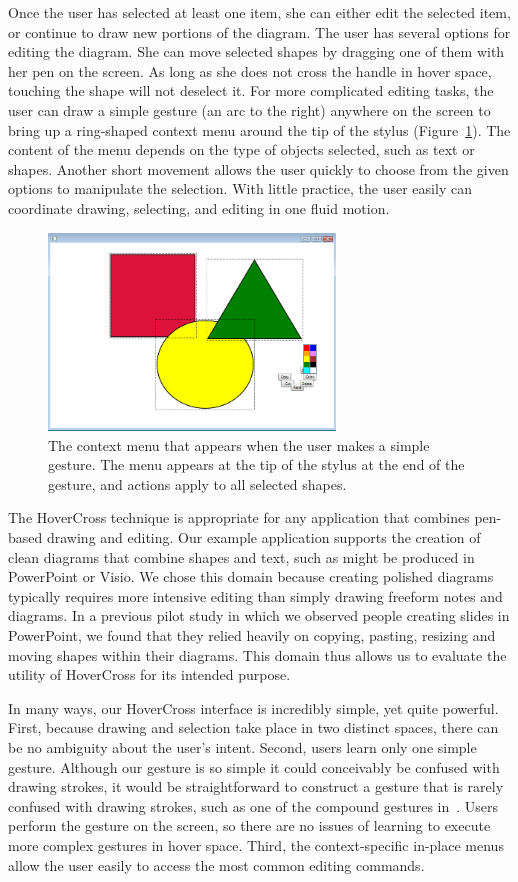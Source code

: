 \documentclass{article}
\begin{document}
Once the user has selected at least one item, she can either edit the
selected item, or continue to draw new portions of the diagram.  The
user has several options for editing the diagram.  She can move
selected shapes by dragging one of them with her pen on the
screen. As long as she does not cross the handle in hover space,
touching the shape will not deselect it.  For more complicated
editing tasks, the user can draw a simple gesture (an arc to the
right) anywhere on the screen to bring up a ring-shaped context menu
around the tip of the stylus (Figure~\ref{fig:contextMenu}).  The
content of the menu depends on the type of objects selected, such
as text or shapes. Another short movement allows the user quickly to
choose from the given options to manipulate the selection. With little
practice, the user easily can coordinate drawing, selecting, and
editing in one fluid motion.

\begin{figure}[tb]
\includegraphics[width=3.0in]{ColorMenu}
\caption{The context menu that appears when the user makes a simple
  gesture.  The menu appears at the tip of the stylus at the end of
  the gesture, and actions apply to all selected shapes.}
\label{fig:contextMenu}
\end{figure}

The HoverCross technique is appropriate for any application that
combines pen-based drawing and editing.  Our example application
supports the creation of clean diagrams that combine shapes and text,
such as might be produced in PowerPoint or Visio.  We chose this
domain because creating polished diagrams typically requires more
intensive editing than simply drawing freeform notes and diagrams. In
a previous pilot study in which we observed people creating slides in
PowerPoint, we found that they relied heavily on copying, pasting,
resizing and moving shapes within their diagrams.  This domain thus
allows us to evaluate the utility of HoverCross for its intended
purpose.

In many ways, our HoverCross interface is incredibly simple, yet quite
powerful.  First, because drawing and selection take place in two
distinct spaces, there can be no ambiguity about the user's
intent. Second, users learn only one simple gesture.  Although our
gesture is so simple it could conceivably be confused with drawing
strokes, it would be straightforward to construct a gesture that is
rarely confused with drawing strokes, such as one of the compound
gestures in~\cite{Laviola2004MathPad}.  Users perform the gesture on
the screen, so there are no issues of learning to execute more complex
gestures in hover space.  Third, the context-specific in-place menus
allow the user easily to access the most common editing commands.
\end{document}
